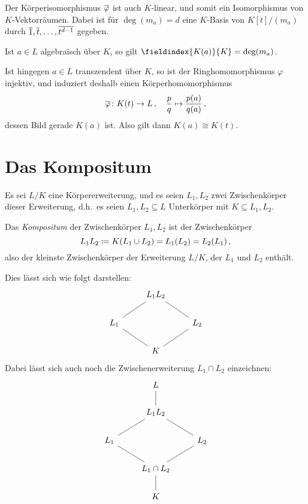 Der Körperisomorphismus $\overline{\varphi}$ ist auch $K$-linear, und somit ein Isomorphismus von $K$-Vektorräumen.
Dabei ist für $\deg(m_a) = d$ eine $K$-Basis von $K[t]/(m_a)$ durch $\overline{1}, \overline{t}, \dotsc, \overline{t^{d-1}}$ gegeben.

\begin{corollary}
  Ist $a \in L$ algebraisch über $K$, so gilt $\fieldindex{K(a)}{K} = \deg(m_a)$.
\end{corollary}

Ist hingegen $a \in L$ transzendent über $K$, so ist der Ringhomomorphismus $\varphi$ injektiv, und induziert deshalb einen Körperhomomorphismus
\[
          \overline{\varphi}
  \colon  K(t)
  \to     L \,,
  \quad   \frac{p}{q}
  \mapsto \frac{p(a)}{q(a)} \,,
\]
dessen Bild gerade $K(a)$ ist.
Also gilt dann $K(a) \cong K(t)$.





\section{Das Kompositum}

Es sei $L/K$ eine Körpererweiterung, und es seien $L_1, L_2$ zwei Zwischenkörper dieser Erweiterung, d.h.\ es seien $L_1, L_2 \subseteq L$ Unterkörper mit $K \subseteq L_1, L_2$.


\begin{definition}
  Das \emph{Kompositum} der Zwischenkörper $L_1, L_2$ ist der Zwischenkörper
  \[
              L_1 L_2
    \coloneqq  K(L_1 \cup L_2)
    =         L_1(L_2)
    =         L_2(L_1) \,,
  \]
  also der kleinste Zwischenkörper der Erweiterung $L/K$, der $L_1$ und $L_2$ enthält.
\end{definition}

Dies lässt sich wie folgt darstellen:
\[
  \begin{tikzcd}
      {}
    & L_1 L_2
    & {}
    \\
      L_1
      \arrow[-]{ru}
    & {}
    & L_2
      \arrow[-]{lu}
    \\
      {}
    & K
      \arrow[-]{lu}
      \arrow[-]{ru}
    & {}
  \end{tikzcd}
\]
Dabei lässt sich auch noch die Zwischenerweiterung $L_1 \cap L_2$ einzeichnen:
\[
  \begin{tikzcd}
      {}
    & L
    & {}
  \\
      {}
    & L_1 L_2
      \arrow[-]{u}
    & {}
    \\
      L_1
      \arrow[-]{ru}
    & {}
    & L_2
      \arrow[-]{lu}
    \\
      {}
    & L_1 \cap L_2
      \arrow[-]{lu}
      \arrow[-]{ru}
    & {}
    \\
      {}
    & K
      \arrow[-]{u}
    & {}
  \end{tikzcd}
\]

